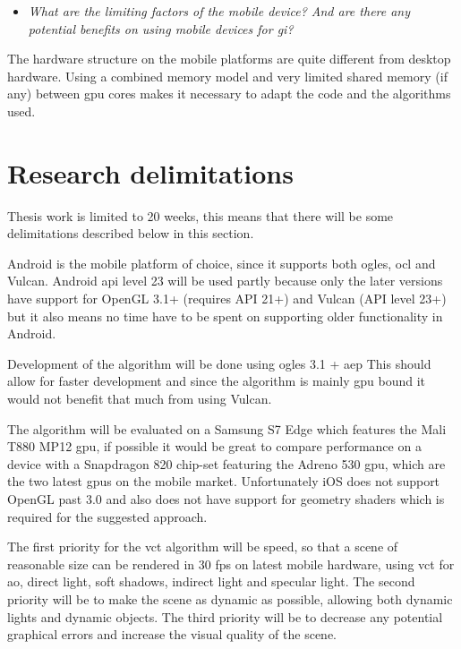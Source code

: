 \documentclass[a4paper, 12pt]{article}
\begin{document}
\begin{itemize}
  \item \textit{What are the limiting factors of the mobile device? And are there any potential benefits on using mobile devices for \gls{gi}?}
\end{itemize}

The hardware structure on the mobile platforms are quite different from desktop hardware. Using a combined memory model and very limited shared memory (if any) between \gls{gpu} cores makes it necessary to adapt the code and the algorithms used.

\section{Research delimitations}
\label{sec:delimitations}

Thesis work is limited to 20 weeks, this means that there will be some delimitations described below in this section.

Android is the mobile platform of choice, since it supports both \gls{ogles}, \gls{ocl} and Vulcan. Android \acrshort{api} level 23 will be used partly because only the later versions have support for OpenGL 3.1+ (requires API 21+) and Vulcan (API level 23+) but it also means no time have to be spent on supporting older functionality in Android.

Development of the algorithm will be done using \gls{ogles} 3.1 + \gls{aep} This should allow for faster development and since the algorithm is mainly \gls{gpu} bound it would not benefit that much from using Vulcan.

The algorithm will be evaluated on a Samsung S7 Edge which features the Mali T880 MP12 \gls{gpu}, if possible it would be great to compare performance on a device with a Snapdragon 820 chip-set featuring the Adreno 530 \gls{gpu}, which are the two latest \glspl{gpu} on the mobile market. Unfortunately iOS does not support OpenGL past 3.0 and also does not have support for geometry shaders which is required for the suggested approach.

The first priority for the \gls{vct} algorithm will be speed, so that a scene of reasonable size can be rendered in 30 fps on latest mobile hardware, using \gls{vct} for \gls{ao}, direct light, soft shadows, indirect light and specular light. The second priority will be to make the scene as dynamic as possible, allowing both dynamic lights and dynamic objects. The third priority will be to decrease any potential graphical errors and increase the visual quality of the scene. 
\end{document}
